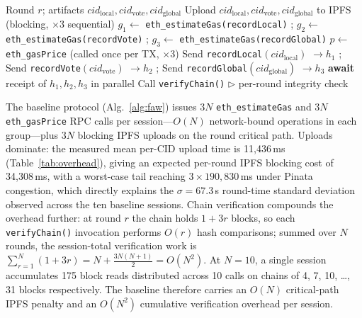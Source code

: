 \documentclass{llncs}
\begin{document}
\begin{algorithm}[h]
\caption{Baseline per-round fire-and-wait blockchain write}
\label{alg:faw}
\begin{algorithmic}[1]
\Require Round $r$; artifacts $\mathit{cid}_{\mathrm{local}}, \mathit{cid}_{\mathrm{vote}}, \mathit{cid}_{\mathrm{global}}$
\State Upload $\mathit{cid}_{\mathrm{local}}, \mathit{cid}_{\mathrm{vote}}, \mathit{cid}_{\mathrm{global}}$ to IPFS (blocking, $\times$3 sequential)
\State $g_1 \leftarrow$ \texttt{eth\_estimateGas(recordLocal)} \quad; $g_2 \leftarrow$ \texttt{eth\_estimateGas(recordVote)} \quad; $g_3 \leftarrow$ \texttt{eth\_estimateGas(recordGlobal)}
\State $p \leftarrow$ \texttt{eth\_gasPrice} (called once per TX, $\times$3)
\State Send \texttt{recordLocal}$(\mathit{cid}_{\mathrm{local}})$ $\rightarrow h_1$ \quad;
       Send \texttt{recordVote}$(\mathit{cid}_{\mathrm{vote}})$ $\rightarrow h_2$ \quad;
       Send \texttt{recordGlobal}$(\mathit{cid}_{\mathrm{global}})$ $\rightarrow h_3$
\State \textbf{await} receipt of $h_1, h_2, h_3$ in parallel
\State Call \texttt{verifyChain()} \quad $\triangleright$ per-round integrity check
\end{algorithmic}
\end{algorithm}

The baseline protocol (Alg.~\ref{alg:faw}) issues $3N$ \texttt{eth\_estimateGas} and $3N$
\texttt{eth\_gasPrice} RPC calls per session---$O(N)$ network-bound operations in each
group---plus $3N$ blocking IPFS uploads on the round critical path.
Uploads dominate: the measured mean per-CID upload time is 11{,}436\,ms
(Table~\ref{tab:overhead}), giving an expected per-round IPFS blocking cost of
34{,}308\,ms, with a worst-case tail reaching $3\times190{,}830$\,ms under Pinata
congestion, which directly explains the $\sigma{=}67.3$\,s round-time standard
deviation observed across the ten baseline sessions.
Chain verification compounds the overhead further: at round $r$ the chain holds
$1{+}3r$ blocks, so each \texttt{verifyChain()} invocation performs $O(r)$ hash
comparisons; summed over $N$ rounds, the session-total verification work is
$\sum_{r=1}^{N}(1{+}3r)=N+\tfrac{3N(N+1)}{2}=O(N^2)$.
At $N{=}10$, a single session accumulates 175 block reads distributed across 10
calls on chains of 4, 7, 10, \ldots, 31 blocks respectively.
The baseline therefore carries an $O(N)$ critical-path IPFS penalty and an
$O(N^2)$ cumulative verification overhead per session.
\end{document}

